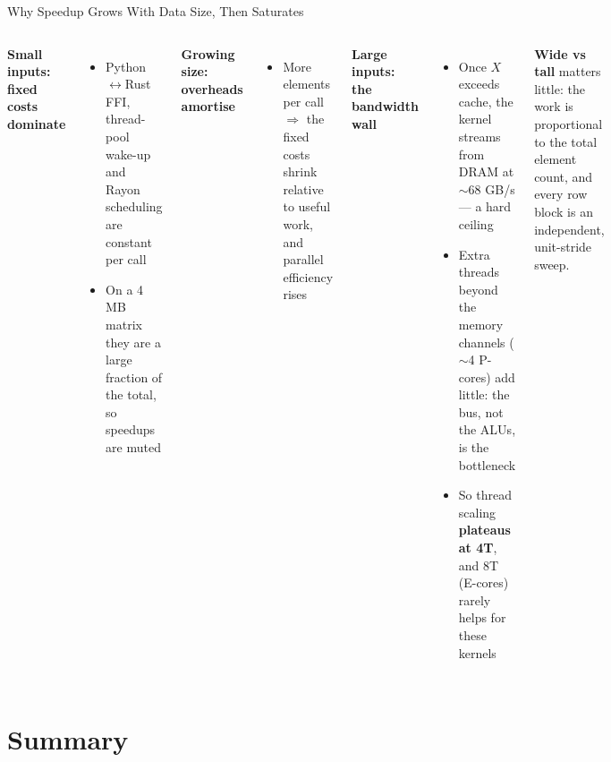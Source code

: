 \documentclass[aspectratio=169]{beamer}
\begin{document}
\begin{frame}{Why Speedup Grows With Data Size, Then Saturates}
  \begin{columns}[T]
    \textbf{Small inputs: fixed costs dominate}
    \begin{itemize}
      \item Python$\leftrightarrow$Rust FFI, thread-pool wake-up and Rayon
            scheduling are constant per call
      \item On a 4 MB matrix they are a large fraction of the total, so speedups
            are muted
    \end{itemize}
    \textbf{Growing size: overheads amortise}
    \begin{itemize}
      \item More elements per call $\Rightarrow$ the fixed costs shrink relative to
            useful work, and parallel efficiency rises
    \end{itemize}
    \textbf{Large inputs: the bandwidth wall}
    \begin{itemize}
      \item Once $X$ exceeds cache, the kernel streams from DRAM at
            $\sim$68 GB/s --- a hard ceiling
      \item Extra threads beyond the memory channels ($\sim$4 P-cores) add little:
            the bus, not the ALUs, is the bottleneck
      \item So thread scaling \textbf{plateaus at 4T}, and 8T (E-cores) rarely
            helps for these kernels
    \end{itemize}
    \vspace{0.3em}
    \textbf{Wide vs tall} matters little: the work is proportional to the total
    element count, and every row block is an independent, unit-stride sweep.
  \end{columns}
\end{frame}

\section{Summary}
\end{document}
